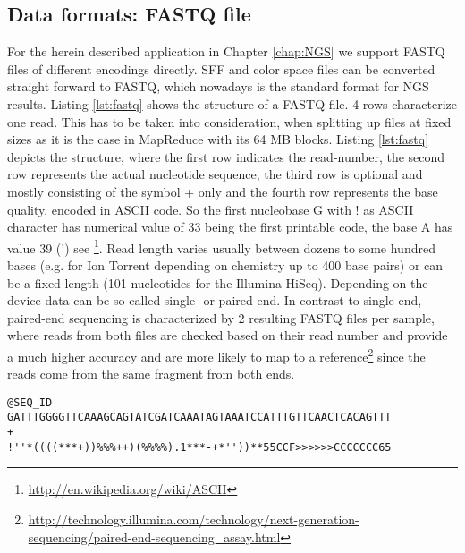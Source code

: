 \subsection{Data formats: FASTQ file}
For the herein described application in Chapter \ref{chap:NGS} we support FASTQ files of different encodings directly. SFF and color space files can be converted straight forward to FASTQ, which nowadays is the standard format for NGS results.
Listing \ref{lst:fastq} shows the structure of a FASTQ file. 4 rows characterize one read. This has to be taken into consideration, when splitting up files at fixed sizes as it is the case in MapReduce with its 64 MB blocks. Listing \ref{lst:fastq} depicts the structure, where the first row indicates the read-number, the second row represents the actual nucleotide sequence, the third row is optional and mostly consisting of the symbol {+} only and the fourth row represents the base quality, encoded in ASCII code. So the first nucleobase G with ! as ASCII character has numerical value of 33 being the first printable code, the base A has value 39 (') see \footnote{\url{http://en.wikipedia.org/wiki/ASCII}}. Read length varies usually between dozens to some hundred bases (e.g. for Ion Torrent depending on chemistry up to 400 base pairs) or can be a fixed length (101 nucleotides for the Illumina HiSeq). Depending on the device data can be so called single- or paired end. In contrast to single-end, paired-end sequencing is characterized by 2 resulting FASTQ files per sample, where reads from both files are checked based on their read number and provide a much higher accuracy and are more likely to map to a reference\footnote{\url{http://technology.illumina.com/technology/next-generation-sequencing/paired-end-sequencing_assay.html}} since the reads come from the same fragment from both ends.
\begin{lstlisting}[caption= {Excerpt of an FASTQ file, 4 rows representing one read}, label={lst:fastq}]
@SEQ_ID
GATTTGGGGTTCAAAGCAGTATCGATCAAATAGTAAATCCATTTGTTCAACTCACAGTTT
+
!''*((((***+))%%%++)(%%%%).1***-+*''))**55CCF>>>>>>CCCCCCC65
\end{lstlisting}

